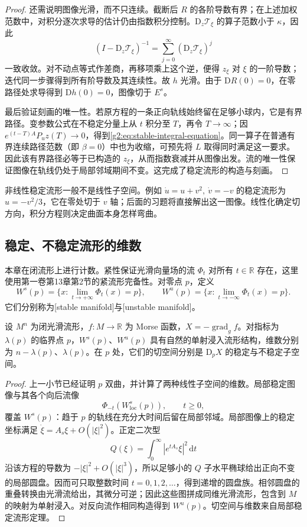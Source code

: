 \begin{proof}
	还需说明图像光滑，而不只连续。截断后 \(R\) 的各阶导数有界；在上述加权范数中，对积分逐次求导的估计仍由指数积分控制。\(\mathrm D_z\mathcal T_\xi\) 的算子范数小于 \(\kappa\)，因此
	\[
		(I-\mathrm D_z\mathcal T_\xi)^{-1}
		=\sum_{j=0}^\infty(\mathrm D_z\mathcal T_\xi)^j
	\]
	一致收敛。对不动点等式作差商，再移项乘上这个逆，便得 \(z_\xi\) 对 \(\xi\) 的一阶导数；迭代同一步骤得到所有阶导数及其连续性。故 \(h\) 光滑。由于 \(\mathrm DR(0)=0\)，在零路径处求导得到 \(\mathrm Dh(0)=0\)，图像切于 \(E^s\)。

	最后验证刻画的唯一性。若原方程的一条正向轨线始终留在足够小球内，它是有界路径。变参数公式在不稳定分量上从 \(t\) 积分至 \(T\)，再令 \(T\to\infty\)；因 \(e^{(t-T)A}P_uz(T)\to0\)，得到\eqref{g2:eq:stable-integral-equation}。同一算子在普通有界连续路径范数（即 \(\beta=0\)）中也为收缩，可预先将 \(L\) 取得同时满足这一要求。因此该有界路径必等于已构造的 \(z_\xi\)，从而指数衰减并从图像出发。流的唯一性保证图像在轨线仍处于局部邻域期间不变。这完成了稳定流形的构造与刻画。
\end{proof}

非线性稳定流形一般不是线性子空间。例如 \(\dot u=u+v^2,\ \dot v=-v\) 的稳定流形为 \(u=-v^2/3\)，它在零处切于 \(v\) 轴；后面的习题将直接解出这一图像。线性化确定切方向，积分方程则决定曲面本身怎样弯曲。

\subsection{稳定、不稳定流形的维数}
\label{g2:subsec:1801:02}

本章在闭流形上进行计数。紧性保证光滑向量场的流 \(\Phi_t\) 对所有 \(t\in\mathbb R\) 存在，这里使用第一卷第13章第2节的紧流形完备性。对零点 \(p\)，定义
\[
	W^s(p)=\{x:\lim_{t\to+\infty}\Phi_t(x)=p\},\qquad
	W^u(p)=\{x:\lim_{t\to-\infty}\Phi_t(x)=p\}.
\]
它们分别称为[stable manifold]与[unstable manifold]。

\begin{proposition}\label{g2:prop:morse-stable-unstable}
	设 \(M^n\) 为闭光滑流形，\(f:M\to\mathbb R\) 为 Morse 函数，\(X=-\operatorname{grad}_g f\)。对指标为 \(\lambda(p)\) 的临界点 \(p\)，\(W^s(p)\)、\(W^u(p)\) 具有自然的单射浸入流形结构，维数分别为 \(n-\lambda(p)\)、\(\lambda(p)\)。在 \(p\) 处，它们的切空间分别是 \(\mathrm D_pX\) 的稳定与不稳定子空间。
\end{proposition}
\begin{proof}
	上一小节已经证明 \(p\) 双曲，并计算了两种线性子空间的维数。局部稳定图像与其各个向后流像
	\[
		\Phi_{-t}(W^s_{\mathrm{loc}}(p)),\qquad t\ge0,
	\]
	覆盖 \(W^s(p)\)：趋于 \(p\) 的轨线在充分大时间后留在局部邻域。局部图像上的稳定坐标满足 \(\dot\xi=A_s\xi+O(|\xi|^2)\)。正定二次型
	\[
		Q(\xi)=\int_0^\infty |e^{tA_s}\xi|^2\,\mathrm dt
	\]
	沿该方程的导数为 \(-|\xi|^2+O(|\xi|^3)\)，所以足够小的 \(Q\) 子水平椭球给出正向不变的局部圆盘。因而可只取整数时间 \(t=0,1,2,\ldots\)，得到递增的圆盘族。相邻圆盘的重叠转换由光滑流给出，其微分可逆；因此这些图拼成同维光滑流形，包含到 \(M\) 的映射为单射浸入。对反向流作相同构造得到 \(W^u(p)\)。切空间与维数来自局部稳定流形定理。
\end{proof}

